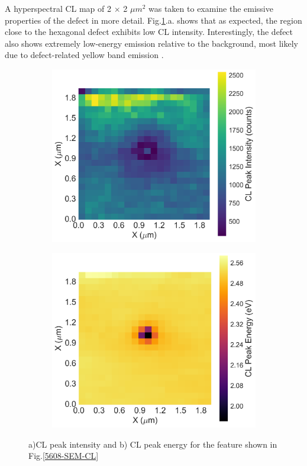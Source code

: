 A hyperspectral CL map of 2 $\times$ 2 $\mu m^{2}$ was taken to examine the emissive properties of the defect in more detail. Fig.\ref{11-CL}.a. shows that as expected, the region close to the hexagonal defect exhibits low CL intensity. Interestingly, the defect also shows extremely low-energy emission relative to the background, most likely due to defect-related yellow band emission \cite{Lyons2010}.

\begin{figure}[h]
	
	\begin{subfigure}[b]{0.48\textwidth}
		\centering
		\includegraphics[width=1\linewidth]{Figs/Ch3/11-peak}
		\caption{}
		
	\end{subfigure}%
	\hspace*{0.5cm}
	\begin{subfigure}[b]{0.48\textwidth}
		\centering
		\includegraphics[width=1\linewidth]{Figs/Ch3/11-centre}
		\caption{}
	\end{subfigure}%
	
	\caption{a)CL peak intensity and b) CL peak energy for the feature shown in Fig.\ref{5608-SEM-CL}}
	\label{11-CL}
\end{figure}
